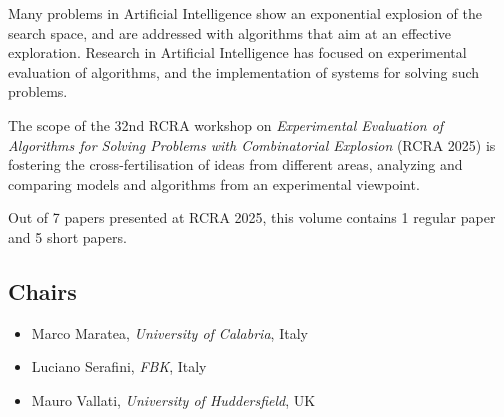 \documentclass[
]{ceurart}
\begin{document}
\maketitle


\noindent
Many problems in Artificial Intelligence show an exponential explosion of the search space, and are addressed with algorithms that aim at an effective exploration.  Research in Artificial Intelligence has focused on experimental evaluation of algorithms, and the implementation of systems for solving such problems.

 

The scope of the 32nd RCRA workshop on \emph{Experimental Evaluation of Algorithms for Solving Problems with Combinatorial Explosion} (RCRA 2025) is fostering the cross-fertilisation of ideas from different areas, analyzing and comparing models and algorithms from an experimental viewpoint.

 

Out of 7 papers presented at RCRA 2025, this volume contains 1 regular paper and 5 short papers.

\subsection*{Chairs}
\begin{itemize}
  \item Marco Maratea, \emph{University of Calabria}, Italy
  \item Luciano Serafini, \emph{FBK}, Italy
  \item Mauro Vallati, \emph{University of Huddersfield}, UK
\end{itemize}
\end{document}
